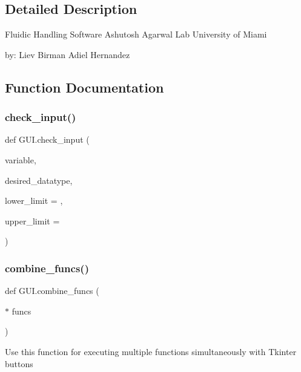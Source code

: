 \subsection{Detailed Description}
\begin{DoxyVerb}Fluidic Handling Software
Ashutosh Agarwal Lab
University of Miami

by:
Liev Birman
Adiel Hernandez
\end{DoxyVerb}
 

\subsection{Function Documentation}
\mbox{\label{namespace_g_u_i_ab5eebe1279ba51c95948fa550f2bc96c}} 
\subsubsection{\texorpdfstring{check\_input()}{check\_input()}}
{\footnotesize\ttfamily def G\+U\+I.\+check\+\_\+input (\begin{DoxyParamCaption}\item[{}]{variable,  }\item[{}]{desired\+\_\+datatype,  }\item[{}]{lower\+\_\+limit = {},  }\item[{}]{upper\+\_\+limit = {} }\end{DoxyParamCaption})}

\mbox{\label{namespace_g_u_i_a4906784b90d5a5544ca9023bee63983e}} 
\subsubsection{\texorpdfstring{combine\_funcs()}{combine\_funcs()}}
{\footnotesize\ttfamily def G\+U\+I.\+combine\+\_\+funcs (\begin{DoxyParamCaption}\item[{$\ast$}]{funcs }\end{DoxyParamCaption})}

\begin{DoxyVerb}Use this function for executing multiple functions simultaneously with Tkinter buttons\end{DoxyVerb}
 \mbox{\label{namespace_g_u_i_aae078fdef2bd79cc7c7c1f2a917c18b1}} 
